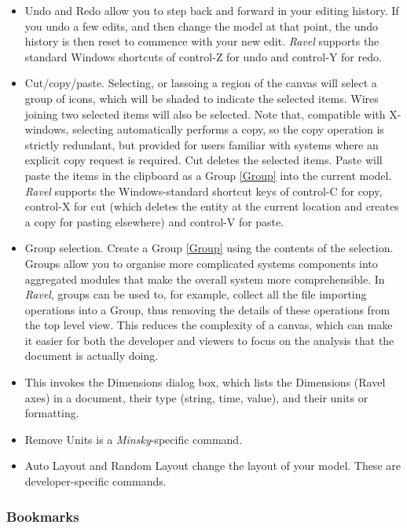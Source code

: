 \label{Edit}
\begin{itemize}
\item \label{edit:undo} Undo and Redo allow you to step back and forward
in your editing history. If you undo a few edits, and then change
the model at that point, the undo history is then reset to commence
with your new edit. \emph{Ravel} supports the standard Windows shortcuts
of control-Z for undo and control-Y for redo.
\item \label{edit:copy} Cut/copy/paste. Selecting, or lassoing a region
of the canvas will select a group of icons, which will be shaded to
indicate the selected items. Wires joining two selected items will
also be selected. Note that, compatible with X-windows, selecting
automatically performs a copy, so the copy operation is strictly redundant,
but provided for users familiar with systems where an explicit copy
request is required. Cut deletes the selected items. Paste will paste
the items in the clipboard as a Group \ref{Group} into the current
model. \emph{Ravel} supports the Windows-standard shortcut keys of
control-C for copy, control-X for cut (which deletes the entity at
the current location and creates a copy for pasting elsewhere) and
control-V for paste.
\item \label{edit:group} Group selection. Create a Group \ref{Group} using
the contents of the selection. Groups allow you to organise more complicated
systems components into aggregated modules that make the overall system
more comprehensible. In \emph{Ravel}, groups can be used to, for example,
collect all the file importing operations into a Group, thus removing
the details of these operations from the top level view. This reduces
the complexity of a canvas, which can make it easier for both the
developer and viewers to focus on the analysis that the document is
actually doing.
\item \label{edit: Dimensions} This invokes the Dimensions dialog box,
which lists the Dimensions (Ravel axes) in a document, their type
(string, time, value), and their units or formatting.
\item Remove Units is a \emph{Minsky}-specific command.
\item Auto Layout and Random Layout change the layout of your model. These
are developer-specific commands.
\end{itemize}

\subsubsection{Bookmarks}

